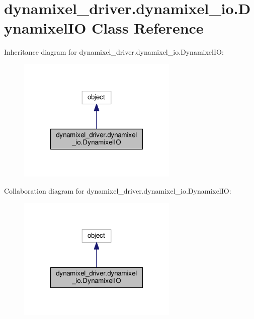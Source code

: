 \hypertarget{classdynamixel__driver_1_1dynamixel__io_1_1_dynamixel_i_o}{}\section{dynamixel\+\_\+driver.\+dynamixel\+\_\+io.\+Dynamixel\+IO Class Reference}
\label{classdynamixel__driver_1_1dynamixel__io_1_1_dynamixel_i_o}


Inheritance diagram for dynamixel\+\_\+driver.\+dynamixel\+\_\+io.\+Dynamixel\+IO\+:
\nopagebreak
\begin{figure}[H]
\begin{center}
\leavevmode
\includegraphics[width=216pt]{d1/df0/classdynamixel__driver_1_1dynamixel__io_1_1_dynamixel_i_o__inherit__graph}
\end{center}
\end{figure}


Collaboration diagram for dynamixel\+\_\+driver.\+dynamixel\+\_\+io.\+Dynamixel\+IO\+:
\nopagebreak
\begin{figure}[H]
\begin{center}
\leavevmode
\includegraphics[width=216pt]{d6/d77/classdynamixel__driver_1_1dynamixel__io_1_1_dynamixel_i_o__coll__graph}
\end{center}
\end{figure}
